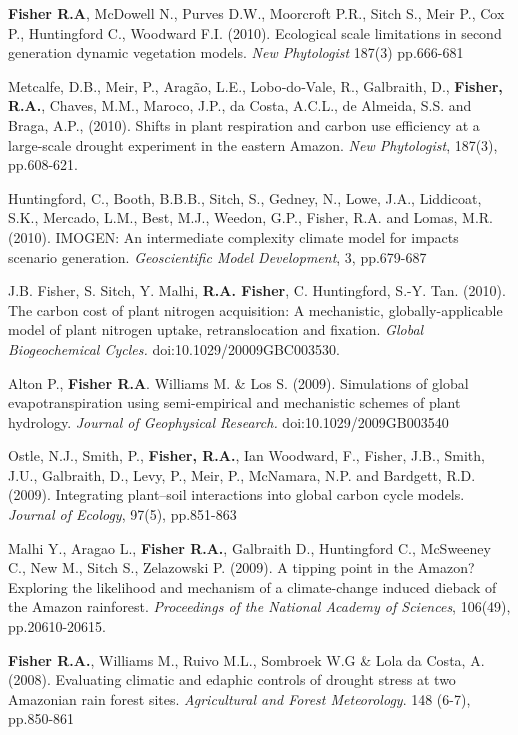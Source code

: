 \documentclass[10pt]{article}
\newenvironment{lonelist}[1][\enskip\textbullet]%
        {\vspace{-\baselineskip}\begin{list}{#1}{%
        \setlength{\itemindent}{-3pt} 
        \setlength{\partopsep}{0pt}%
        \setlength{\leftmargin}{10pt}
        \setlength{\topsep}{15pt}}}
        {\end{list}\vspace{-.3\baselineskip}}
\begin{document}
\begin{lonelist}
{{\item [13] \textbf{Fisher R.A}, McDowell N., Purves D.W., Moorcroft P.R., Sitch S., Meir P., Cox P., Huntingford C., Woodward F.I. (2010). Ecological scale limitations in second generation dynamic vegetation models. \emph{New Phytologist} 187(3) pp.666-681
\item[12] {Metcalfe, D.B., Meir, P., Aragão, L.E., Lobo‐do‐Vale, R., Galbraith, D., \textbf{Fisher, R.A.}, Chaves, M.M., Maroco, J.P., da Costa, A.C.L., de Almeida, S.S. and Braga, A.P., (2010). Shifts in plant respiration and carbon use efficiency at a large‐scale drought experiment in the eastern Amazon. \emph{New Phytologist}, 187(3), pp.608-621.}
\item[11] {Huntingford, C., Booth, B.B.B., Sitch, S., Gedney, N., Lowe, J.A., Liddicoat, S.K., Mercado, L.M., Best, M.J., Weedon, G.P., Fisher, R.A. and Lomas, M.R. (2010). IMOGEN: An intermediate complexity climate model for impacts scenario generation.  \emph{Geoscientific Model Development}, 3, pp.679-687
\item [10] J.B. Fisher, S. Sitch, Y. Malhi,  \textbf{R.A. Fisher}, C. Huntingford, S.-Y. Tan. (2010). The carbon cost of plant nitrogen acquisition: A mechanistic, globally-applicable model of plant nitrogen uptake, retranslocation and fixation. \emph{Global Biogeochemical Cycles. }  doi:10.1029/20009GBC003530. 
\item [9] Alton P., \textbf{Fisher R.A}. Williams M. \& Los S. (2009). Simulations of global evapotranspiration using semi-empirical and mechanistic schemes of plant hydrology.   \emph{Journal of Geophysical Research.}  doi:10.1029/2009GB003540 
\item[8] {Ostle, N.J., Smith, P., \textbf{Fisher, R.A.}, Ian Woodward, F., Fisher, J.B., Smith, J.U., Galbraith, D., Levy, P., Meir, P., McNamara, N.P. and Bardgett, R.D. (2009). Integrating plant–soil interactions into global carbon cycle models. \emph{Journal of Ecology}, 97(5), pp.851-863} 
\item [7]  Malhi Y., Aragao L.,  \textbf{Fisher R.A.}, Galbraith D., Huntingford C., McSweeney C., New M., Sitch S., Zelazowski P. (2009). A tipping point in the Amazon? Exploring the likelihood and mechanism of a climate-change induced dieback of the Amazon rainforest.  \emph{Proceedings of the National Academy of Sciences}, 106(49), pp.20610-20615.
\item[6] {\textbf{Fisher R.A.}, Williams M., Ruivo M.L., Sombroek W.G \& Lola da Costa, A. (2008). Evaluating climatic and edaphic controls of drought stress at two Amazonian rain forest sites.  \emph{Agricultural and Forest Meteorology}.  148 (6-7), pp.850-861}
}}}
\end{lonelist}
\end{document}
